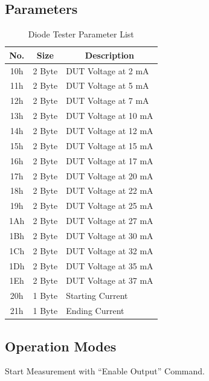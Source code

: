 \subsection{Parameters}
\begin{table}[H]
    \centering
    \begin{tabular}{|c|c|l|}
        \hline
        \textbf{No.}   &   \textbf{Size} & \multicolumn{1}{|c|}{\textbf{Description}}\\ \hline \hline
        10h   &  2 Byte & DUT Voltage at 2 mA \\ \hline
		11h   &  2 Byte & DUT Voltage at 5 mA \\ \hline
		12h   &  2 Byte & DUT Voltage at 7 mA \\ \hline
		13h   &  2 Byte & DUT Voltage at 10 mA \\ \hline
		14h   &  2 Byte & DUT Voltage at 12 mA \\ \hline
		15h   &  2 Byte & DUT Voltage at 15 mA \\ \hline
		16h   &  2 Byte & DUT Voltage at 17 mA \\ \hline
		17h   &  2 Byte & DUT Voltage at 20 mA \\ \hline
		18h   &  2 Byte & DUT Voltage at 22 mA \\ \hline
		19h   &  2 Byte & DUT Voltage at 25 mA \\ \hline
		1Ah   &  2 Byte & DUT Voltage at 27 mA \\ \hline
		1Bh   &  2 Byte & DUT Voltage at 30 mA \\ \hline
		1Ch   &  2 Byte & DUT Voltage at 32 mA \\ \hline
		1Dh   &  2 Byte & DUT Voltage at 35 mA \\ \hline
		1Eh   &  2 Byte & DUT Voltage at 37 mA \\ \hline
		20h   &  1 Byte & Starting Current	\\ \hline
		21h   &  1 Byte & Ending Current \\ \hline
    \end{tabular}
	\caption{Diode Tester Parameter List}
\label{tab:Par-Diode}
\end{table}
\subsection{Operation Modes}
Start Measurement with ``Enable Output'' Command.

